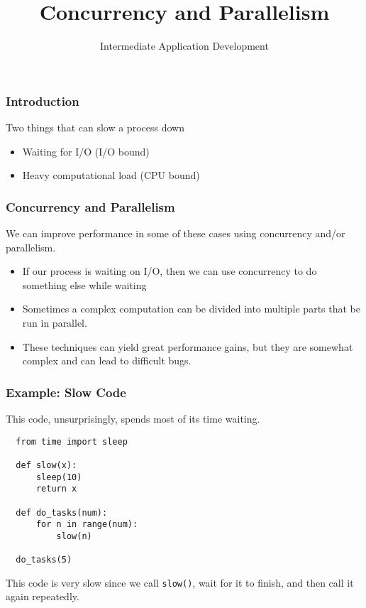 \documentclass[10pt]{beamer}
\title{Concurrency and Parallelism}
\author[IN608]{Intermediate Application Development}
\institute[Otago Polytechnic]{
  Otago Polytechnic \\
  Dunedin, New Zealand \\
  Kaiako: Tom Clark
}
\date{}
\begin{document}
\begin{frame}[plain]
  \titlepage
\end{frame}

\begin{frame}
  \frametitle{Introduction}
  
  Two things that can slow a process down  
  
  \begin{itemize}
    \item Waiting for I/O (I/O bound)
    \item Heavy  computational load (CPU bound)
  \end{itemize}  
\end{frame}

\begin{frame}
  \frametitle{Concurrency and Parallelism}

  We can improve performance in some of these cases using concurrency and/or
  parallelism.
  
  \begin{itemize}
    \item If our process is waiting on I/O, then we can use concurrency to 
    do something else while waiting
    \item Sometimes a complex computation can be divided into multiple parts 
    that be run in parallel.
    \item These techniques can yield great performance gains, but they are 
    somewhat complex and can lead to difficult bugs.
  \end{itemize}  

\end{frame}


\begin{frame}[fragile]
  \frametitle{Example: Slow Code}
  
  This code, unsurprisingly, spends most of its time waiting.
  \begin{verbatim}
  from time import sleep
  
  def slow(x):
      sleep(10)
      return x
  
  def do_tasks(num):
      for n in range(num):
          slow(n)
          
  do_tasks(5)                                                                                                     
 \end{verbatim} 
 This code is very slow since we call \texttt{slow()}, wait for it to 
 finish, and then call it again repeatedly.
 
     
\end{frame}
\end{document}
